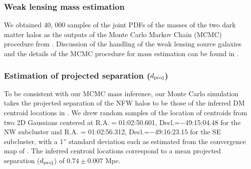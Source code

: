 \documentclass[ucdthesis.tex]{subfiles}
\begin{document}
    \subsubsection{Weak lensing mass estimation} 
    \label{subsubsec:WL_mass_estimate}
    We obtained 40, 000 samples of the joint PDFs of the masses of the two dark
    matter halos as the outputs of the Monte Carlo Markov Chain (MCMC)
    procedure from \citealt{Jee13}. Discussion of the handling of the weak
    lensing source galaxies and the details of the MCMC procedure for mass
    estimation can be found in \citealt{Jee13}. 
    \subsubsection{Estimation of projected separation ($d_{\rm proj}$)} 
    \label{subsubsec:proj_sep}
    To be consistent with our MCMC mass inference, our Monte Carlo simulation takes 
    the projected separation of the NFW halos to be those of the inferred
    DM centroid locations in \citealt{Jee13}. We drew random samples
     of the location of centroids from two 2D Gaussians centered at
     R.A.$=$01:02:50.601, Decl.=$-$49:15:04.48 for the NW subcluster and R.A. =
     01:02:56.312, Decl.=$-$49:16:23.15 for the SE
    subcluster, with a 1'' standard deviation each as estimated from the
    convergence map of \citet{Jee13}. The
    inferred centroid locations correspond to a mean projected separation
    ($d_{\rm proj}$) of $0.74\pm {0.007}$ Mpc.  
\end{document}
